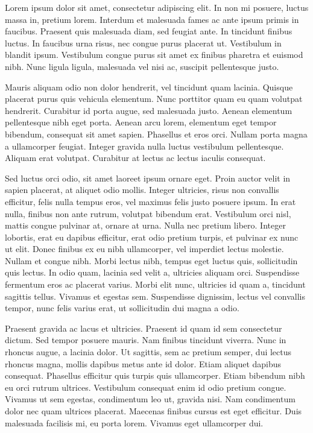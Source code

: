 Lorem ipsum dolor sit amet, consectetur adipiscing elit. In non mi posuere, luctus massa in, pretium lorem. Interdum et malesuada fames ac ante ipsum primis in faucibus. Praesent quis malesuada diam, sed feugiat ante. In tincidunt finibus luctus. In faucibus urna risus, nec congue purus placerat ut. Vestibulum in blandit ipsum. Vestibulum congue purus sit amet ex finibus pharetra et euismod nibh. Nunc ligula ligula, malesuada vel nisi ac, suscipit pellentesque justo.

Mauris aliquam odio non dolor hendrerit, vel tincidunt quam lacinia. Quisque placerat purus quis vehicula elementum. Nunc porttitor quam eu quam volutpat hendrerit. Curabitur id porta augue, sed malesuada justo. Aenean elementum pellentesque nibh eget porta. Aenean arcu lorem, elementum eget tempor bibendum, consequat sit amet sapien. Phasellus et eros orci. Nullam porta magna a ullamcorper feugiat. Integer gravida nulla luctus vestibulum pellentesque. Aliquam erat volutpat. Curabitur at lectus ac lectus iaculis consequat.

Sed luctus orci odio, sit amet laoreet ipsum ornare eget. Proin auctor velit in sapien placerat, at aliquet odio mollis. Integer ultricies, risus non convallis efficitur, felis nulla tempus eros, vel maximus felis justo posuere ipsum. In erat nulla, finibus non ante rutrum, volutpat bibendum erat. Vestibulum orci nisl, mattis congue pulvinar at, ornare at urna. Nulla nec pretium libero. Integer lobortis, erat eu dapibus efficitur, erat odio pretium turpis, et pulvinar ex nunc ut elit. Donec finibus ex eu nibh ullamcorper, vel imperdiet lectus molestie. Nullam et congue nibh. Morbi lectus nibh, tempus eget luctus quis, sollicitudin quis lectus. In odio quam, lacinia sed velit a, ultricies aliquam orci. Suspendisse fermentum eros ac placerat varius. Morbi elit nunc, ultricies id quam a, tincidunt sagittis tellus. Vivamus et egestas sem. Suspendisse dignissim, lectus vel convallis tempor, nunc felis varius erat, ut sollicitudin dui magna a odio.

Praesent gravida ac lacus et ultricies. Praesent id quam id sem consectetur dictum. Sed tempor posuere mauris. Nam finibus tincidunt viverra. Nunc in rhoncus augue, a lacinia dolor. Ut sagittis, sem ac pretium semper, dui lectus rhoncus magna, mollis dapibus metus ante id dolor. Etiam aliquet dapibus consequat. Phasellus efficitur quis turpis quis ullamcorper. Etiam bibendum nibh eu orci rutrum ultrices. Vestibulum consequat enim id odio pretium congue. Vivamus ut sem egestas, condimentum leo ut, gravida nisi. Nam condimentum dolor nec quam ultrices placerat. Maecenas finibus cursus est eget efficitur. Duis malesuada facilisis mi, eu porta lorem. Vivamus eget ullamcorper dui.

